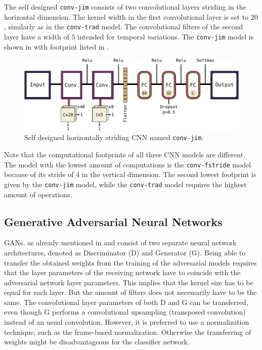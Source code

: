 The self designed \texttt{conv-jim} consists of two convolutional layers striding in the horizontal dimension.
The kernel width in the first convolutional layer is set to $20$, similarly as in the \texttt{conv-trad} model.
The convolutional filters of the second layer have a width of $5$ intended for temporal variations.
The \texttt{conv-jim} model is shown in  with footprint listed in .
\begin{figure}[!ht]
  \centering
    \includegraphics[height=0.23\textwidth]{./4_nn/figs/nn_arch_cnn_jim.pdf}
  \caption{Self designed horizontally striding CNN named \texttt{conv-jim}.}
  \label{fig:nn_arch_cnn_jim}
\end{figure}
\FloatBarrier
\noindent


Note that the computational footprints of all three CNN models are different.
The model with the lowest amount of computations is the \texttt{conv-fstride} model because of its stride of 4 in the vertical dimension.
The second lowest footprint is given by the \texttt{conv-jim} model, while the \texttt{conv-trad} model requires the highest amount of operations.



\subsection{Generative Adversarial Neural Networks}\label{sec:nn_arch_adv}
GANs, as already mentioned in  and  consist of two separate neural network architectures, denoted as Discriminator (D) and Generator (G).
Being able to transfer the obtained weights from the training of the adversarial models requires that the layer parameters of the receiving network have to coincide with the adversarial network layer parameters.
This implies that the kernel size has to be equal for each layer.
But the amount of filters does not necessarily have to be the same.
The convolutional layer parameters of both D and G can be transferred, even though G performs a convolutional upsampling (transposed convolution) instead of an usual convolution.
However, it is preferred to use a normalization technique, such as the frame-based normalization. 
Otherwise the transferring of weights might be disadvantageous for the classifier network.

